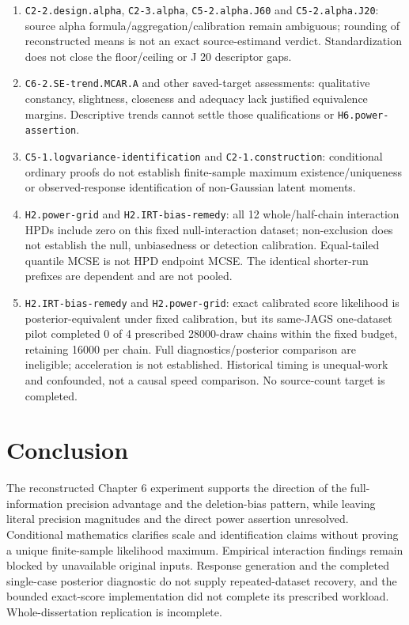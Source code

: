 \documentclass[11pt]{article}
\begin{document}
\begin{enumerate}
\item\label{lim:9} \nolinkurl{C2-2.design.alpha}, \nolinkurl{C2-3.alpha}, \nolinkurl{C5-2.alpha.J60} and \nolinkurl{C5-2.alpha.J20}: source alpha formula/aggregation/calibration remain ambiguous; rounding of reconstructed means is not an exact source-estimand verdict. Standardization does not close the floor/ceiling or J 20 descriptor gaps.
\item\label{lim:10} \nolinkurl{C6-2.SE-trend.MCAR.A} and other saved-target assessments: qualitative constancy, slightness, closeness and adequacy lack justified equivalence margins. Descriptive trends cannot settle those qualifications or \nolinkurl{H6.power-assertion}.
\item\label{lim:11} \nolinkurl{C5-1.logvariance-identification} and \nolinkurl{C2-1.construction}: conditional ordinary proofs do not establish finite-sample maximum existence/uniqueness or observed-response identification of non-Gaussian latent moments.
\item\label{lim:12} \nolinkurl{H2.power-grid} and \nolinkurl{H2.IRT-bias-remedy}: all 12 whole/half-chain interaction HPDs include zero on this fixed null-interaction dataset; non-exclusion does not establish the null, unbiasedness or detection calibration. Equal-tailed quantile MCSE is not HPD endpoint MCSE. The identical shorter-run prefixes are dependent and are not pooled.
\item\label{lim:13} \nolinkurl{H2.IRT-bias-remedy} and \nolinkurl{H2.power-grid}: exact calibrated score likelihood is posterior-equivalent under fixed calibration, but its same-JAGS one-dataset pilot completed 0 of 4 prescribed 28000-draw chains within the fixed budget, retaining 16000 per chain. Full diagnostics/posterior comparison are ineligible; acceleration is not established. Historical timing is unequal-work and confounded, not a causal speed comparison. No source-count target is completed.
\end{enumerate}
\section{Conclusion}\label{sec:conclusion}
The reconstructed Chapter 6 experiment supports the direction of the full-information precision advantage and the deletion-bias pattern, while leaving literal precision magnitudes and the direct power assertion unresolved. Conditional mathematics clarifies scale and identification claims without proving a unique finite-sample likelihood maximum. Empirical interaction findings remain blocked by unavailable original inputs. Response generation and the completed single-case posterior diagnostic do not supply repeated-dataset recovery, and the bounded exact-score implementation did not complete its prescribed workload. Whole-dissertation replication is incomplete.
\end{document}

